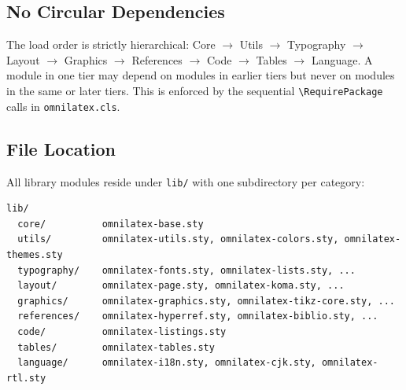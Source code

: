 \subsection{No Circular Dependencies}

The load order is strictly hierarchical: Core $\to$ Utils $\to$
Typography $\to$ Layout $\to$ Graphics $\to$ References $\to$ Code $\to$
Tables $\to$ Language.  A module in one tier may depend on modules in
earlier tiers but never on modules in the same or later tiers.  This is
enforced by the sequential \texttt{\textbackslash RequirePackage} calls
in \texttt{omnilatex.cls}.

\subsection{File Location}

All library modules reside under \texttt{lib/} with one subdirectory per
category:

\begin{verbatim}
lib/
  core/          omnilatex-base.sty
  utils/         omnilatex-utils.sty, omnilatex-colors.sty, omnilatex-themes.sty
  typography/    omnilatex-fonts.sty, omnilatex-lists.sty, ...
  layout/        omnilatex-page.sty, omnilatex-koma.sty, ...
  graphics/      omnilatex-graphics.sty, omnilatex-tikz-core.sty, ...
  references/    omnilatex-hyperref.sty, omnilatex-biblio.sty, ...
  code/          omnilatex-listings.sty
  tables/        omnilatex-tables.sty
  language/      omnilatex-i18n.sty, omnilatex-cjk.sty, omnilatex-rtl.sty
\end{verbatim}
